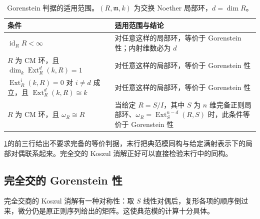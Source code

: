 \begin{table}[htbp]
	\centering
	\caption[Gorenstein 判据的适用范围]{Gorenstein 判据的适用范围。\((R,\mathfrak m,k)\) 为交换 Noether 局部环，\(d=\dim R\)。}
	\label{b3:tab:gorenstein-criteria}
	\begin{tabularx}{\textwidth}{@{}>{\raggedright\arraybackslash}p{}>{\raggedright\arraybackslash}X@{}}
		\toprule
		条件 & 适用范围与结论\\
		\midrule
		\(\operatorname{id}_RR<\infty\) & 对任意这样的局部环，等价于 Gorenstein 性；内射维数必为 \(d\)\\
		\(R\) 为 CM 环，且 \(\dim_k\operatorname{Ext}_R^d(k,R)=1\) & 对任意这样的局部环，等价于 Gorenstein 性\\
		\(\operatorname{Ext}_R^i(k,R)=0\) 对 \(i\ne d\) 成立，且 \(\operatorname{Ext}_R^d(k,R)\cong k\) & 对任意这样的局部环，等价于 Gorenstein 性\\
		\(R\) 为 CM 环，且 \(\omega_R\cong R\) & 当给定 \(R=S/I\)，其中 \(S\) 为 \(n\) 维完备正则局部环、\(\omega_R=\operatorname{Ext}_S^{n-d}(R,S)\) 时，此条件等价于 Gorenstein 性\\
		\bottomrule
	\end{tabularx}
\end{table}

\cref{b3:tab:gorenstein-criteria}的前三行给出不要求完备的等价判据，末行把典范模同构与给定满射表示下的局部对偶联系起来。完全交的 Koszul 消解正好可以直接检验末行中的同构。

\subsection{完全交的 Gorenstein 性}
\label{b3:subsec:2203:03}

完全交商的 Koszul 消解有一种对称性：取 \(S\) 线性对偶后，复形各项的顺序倒过来，微分仍是原正则序列给出的矩阵。这使典范模的计算十分具体。


